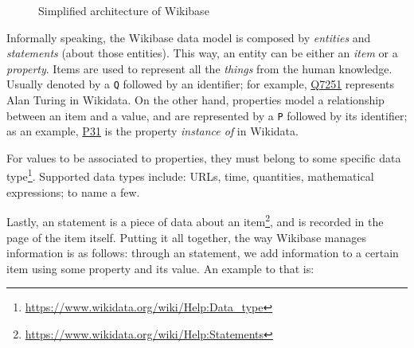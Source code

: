 \begin{figure}[h]
    \centering
    
    \caption[Simplified architecture of Wikibase]{Simplified architecture of Wikibase~\cite{https://doi.org/10.48550/arxiv.2110.11709}}
    \label{fig:architecture:wikibase}
\end{figure}

Informally speaking, the Wikibase data model is composed by \textit{entities} and \textit{statements} (about those entities). This way, an entity can be either an \textit{item} or a \textit{property}. Items are used to represent all the \textit{things} from the human knowledge. Usually denoted by a \texttt{Q} followed by an identifier; for example, \href{https://www.wikidata.org/wiki/Q7251}{Q7251} represents Alan Turing in Wikidata. On the other hand, properties model a relationship between an item and a value, and are represented by a \texttt{P} followed by its identifier; as an example, \href{https://www.wikidata.org/wiki/Property:P31}{P31} is the property \textit{instance of} in Wikidata.

For values to be associated to properties, they must belong to some specific data type\footnote{\url{https://www.wikidata.org/wiki/Help:Data_type}}. Supported data types include: URLs, time, quantities, mathematical expressions; to name a few.

Lastly, an statement is a piece of data about an item\footnote{\url{https://www.wikidata.org/wiki/Help:Statements}}, and is recorded in the page of the item itself. Putting it all together, the way Wikibase manages information is as follows: through an statement, we add information to a certain item using some property and its value. An example to that is:

